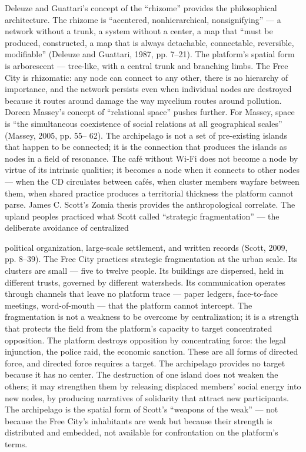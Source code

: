 Deleuze and Guattari’s concept of the “rhizome” provides the philosophical architecture. The rhizome is “acentered, nonhierarchical, nonsignifying” — a network without a trunk, a system without a center, a map that “must be produced, constructed, a map that is always detachable, connectable, reversible, modifiable” (Deleuze and Guattari, 1987, pp. 7–21). The platform’s spatial form is arborescent — tree-like, with a central trunk and branching limbs. The Free City is rhizomatic: any node can connect to any other, there is no hierarchy of importance, and the network persists even when individual nodes are destroyed because it routes around damage the way mycelium routes around pollution. Doreen Massey’s concept of “relational space” pushes further. For Massey, space is “the simultaneous coexistence of social relations at all geographical scales” (Massey, 2005, pp. 55– 62). The archipelago is not a set of pre-existing islands that happen to be connected; it is the connection that produces the islands as nodes in a field of resonance. The café without Wi-Fi does not become a node by virtue of its intrinsic qualities; it becomes a node when it connects to other nodes — when the CD circulates between cafés, when cluster members wayfare between them, when shared practice produces a territorial thickness the platform cannot parse. James C. Scott’s Zomia thesis provides the anthropological correlate. The upland peoples practiced what Scott called “strategic fragmentation” — the deliberate avoidance of centralized

political organization, large-scale settlement, and written records (Scott, 2009, pp. 8–39). The Free City practices strategic fragmentation at the urban scale. Its clusters are small — five to twelve people. Its buildings are dispersed, held in different trusts, governed by different watersheds. Its communication operates through channels that leave no platform trace — paper ledgers, face-to-face meetings, word-of-mouth — that the platform cannot intercept. The fragmentation is not a weakness to be overcome by centralization; it is a strength that protects the field from the platform’s capacity to target concentrated opposition. The platform destroys opposition by concentrating force: the legal injunction, the police raid, the economic sanction. These are all forms of directed force, and directed force requires a target. The archipelago provides no target because it has no center. The destruction of one island does not weaken the others; it may strengthen them by releasing displaced members’ social energy into new nodes, by producing narratives of solidarity that attract new participants. The archipelago is the spatial form of Scott’s “weapons of the weak” — not because the Free City’s inhabitants are weak but because their strength is distributed and embedded, not available for confrontation on the platform’s terms.

